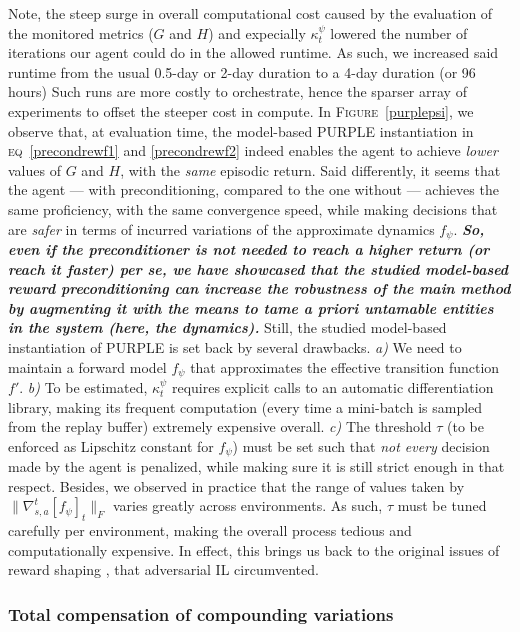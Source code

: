 Note, the steep surge in overall computational cost caused by the evaluation of the monitored metrics
($G$ and $H$) and expecially $\kappa_t^\psi$ lowered the number of iterations our agent could do in the allowed runtime.
As such, we increased said runtime from the usual 0.5-day or 2-day duration to a 4-day duration (or 96 hours)
Such runs are more costly to orchestrate,
hence the sparser array of experiments to offset the steeper cost in compute.
In \textsc{Figure}~\ref{purplepsi},
we observe that, at evaluation time,
the model-based PURPLE instantiation in \textsc{eq}~\ref{precondrewf1} and \ref{precondrewf2}
indeed enables the agent to achieve \emph{lower} values of $G$ and $H$,
with the \emph{same} episodic return.
Said differently, it seems that the agent --- with preconditioning, compared to the one without ---
achieves the same proficiency, with the same convergence speed, while making decisions
that are \emph{safer} in terms of incurred variations of the approximate dynamics $f_\psi$.
\textbf{\emph{
So, even if the preconditioner is not needed to reach a higher return (or reach it faster) \textit{per se},
we have showcased that the studied model-based reward preconditioning can increase the robustness of the main method
by augmenting it with the means to tame \textit{a priori} untamable entities in the system (here, the dynamics).
}}
Still, the studied model-based instantiation of PURPLE is set back by several drawbacks.
\textit{a)} We need to maintain a forward model $f_\psi$ that approximates the effective transition function $f'$.
\textit{b)} To be estimated, $\kappa_t^\psi$ requires explicit calls to an automatic differentiation library,
making its frequent computation (every time a mini-batch is sampled from the replay buffer) extremely expensive overall.
\textit{c)} The threshold $\tau$ (to be enforced as Lipschitz constant for $f_\psi$) must be set such that
\emph{not every} decision made by the agent is penalized, while making sure it is still strict enough in that respect.
Besides, we observed in practice that the range of values taken by $\lVert\nabla_{s,a}^t[f_\psi]_t\rVert _F$
varies greatly across environments.
As such, $\tau$ must be tuned carefully per environment, making the overall process
tedious and computationally expensive.
In effect, this brings us back to the original issues of reward shaping \cite{Ng1999-lv},
that adversarial IL \cite{Ho2016-bv} circumvented.

\subsubsection{Total compensation of compounding variations}

